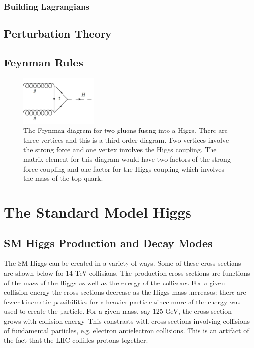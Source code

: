 \subsubsection{Building Lagrangians}
\subsection{Perturbation Theory}
\subsection{Feynman Rules}

\begin{figure}[h!]
  \centering
  \includegraphics[width=1.5in]{images/ggf.png}
  \caption
   {The Feynman diagram for two gluons fusing into a Higgs. There are three vertices and this is a third order diagram. Two vertices involve the strong force and one vertex involves the Higgs coupling. The matrix element for this diagram would have two factors of the strong force coupling and one factor for the Higgs coupling which involves the mass of the top quark.}
  \label{fig:feynggf}
\end{figure}

\section{The Standard Model Higgs}


\subsection{SM Higgs Production and Decay Modes}

The SM Higgs can be created in a variety of ways. Some of these cross sections are shown below for 14 TeV collisions. The production cross sections are functions of the mass of the Higgs as well as the energy of the collisons. For a given collision energy the cross sections decrease as the Higgs mass increases: there are fewer kinematic possibilities for a heavier particle since more of the energy was used to create the particle. For a given mass, say 125 GeV, the cross section grows with collision energy. This constrasts with cross sections involving collisions of fundamental particles, e.g. electron antielectron collisions. This is an artifact of the fact that the LHC collides protons together. 

